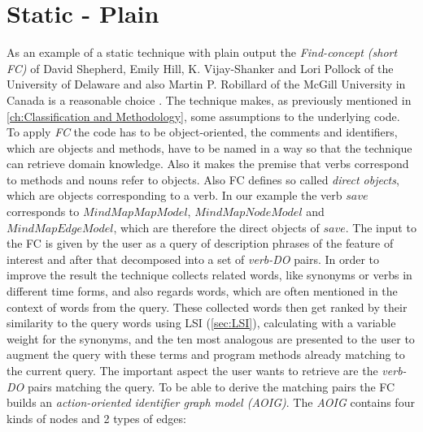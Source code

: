 \section{Static - Plain}
\label{sec:find-concept}
As an example of a static technique with plain output the \emph{Find-concept (short FC)} of David Shepherd, Emily Hill, K. Vijay-Shanker and Lori Pollock of the University of Delaware and also Martin P. Robillard of the McGill University in Canada is a reasonable choice \cite{shepherd2007using}.
The technique makes, as previously mentioned in \autoref{ch:Classification and Methodology}, some assumptions to the underlying code. To apply \emph{FC} the code has to be object-oriented, the comments and identifiers, which are objects and methods, have to be named in a way so that the technique can retrieve domain knowledge. Also it makes the premise that verbs correspond to methods and nouns refer to objects. Also FC defines so called \textit{direct objects}, which are objects corresponding to a verb. In our example the verb $save$ corresponds to $MindMapMapModel$, $MindMapNodeModel$ and $MindMapEdgeModel$, which are therefore the direct objects of $save$.\newline
\emptyLine
The input to the FC is given by the user as a query of description phrases of the feature of interest and after that decomposed into a set of \textit{verb-DO} pairs. In order to improve the result the technique collects related words, like synonyms or verbs in different time forms, and also regards words, which are often mentioned in the context of words from the query. These collected words then get ranked by their similarity to the query words using LSI (\autoref{sec:LSI}), calculating with a variable weight for the synonyms, and the ten most analogous are presented to the user to augment the query with these terms and program methods already matching to the current query.\newline
\emptyLine
The important aspect the user wants to retrieve are the \textit{verb-DO} pairs matching the query. To be able to derive the matching pairs the FC builds an \textit{action-oriented identifier graph model (AOIG)}. The \textit{AOIG} contains four kinds of nodes and 2 types of edges:


